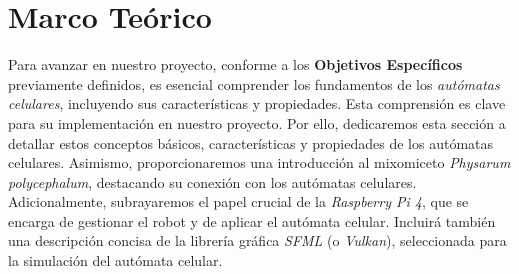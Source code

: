 \section{Marco Te\'orico}
\label{sec:marco_teorico}
    Para avanzar en nuestro proyecto, conforme a los \textbf{Objetivos Espec\'ificos} previamente definidos, 
        es esencial comprender los fundamentos de los \textit{aut\'omatas celulares}, incluyendo sus caracter\'isticas 
        y propiedades. Esta comprensi\'on es clave para su implementaci\'on en nuestro proyecto. Por ello, dedicaremos 
        esta secci\'on a detallar estos conceptos b\'asicos, caracter\'isticas y propiedades de los aut\'omatas celulares. 
        Asimismo, proporcionaremos una introducci\'on al mixomiceto \textit{Physarum polycephalum}, destacando su conexi\'on 
        con los aut\'omatas celulares.
    \vskip 0.5cm
    Adicionalmente, subrayaremos el papel crucial de la \textit{Raspberry Pi 4}, 
        que se encarga de gestionar el robot y de aplicar el aut\'omata celular. Incluir\'a 
        tambi\'en una descripci\'on concisa de la librer\'ia gr\'afica \textit{SFML} (o \textit{Vulkan}), 
        seleccionada para la simulaci\'on del aut\'omata celular.

    
    
    